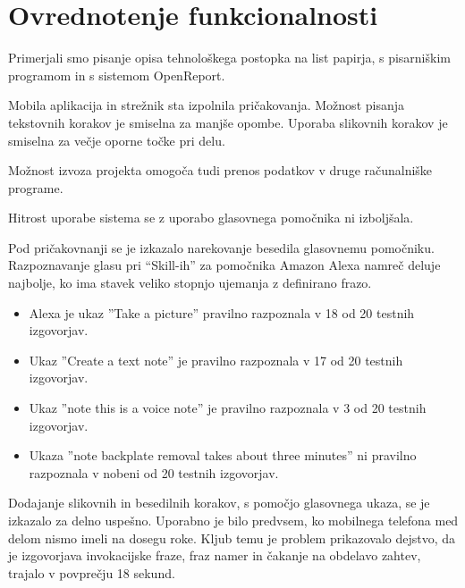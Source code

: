 \documentclass[a4paper, 12pt]{book}
\begin{document}



\section{Ovrednotenje funkcionalnosti}


Primerjali smo pisanje opisa tehnološkega postopka na list papirja, s pisarniškim programom in s sistemom OpenReport.

Mobila aplikacija in strežnik sta izpolnila pričakovanja.
Možnost pisanja tekstovnih korakov je smiselna za manjše opombe.
Uporaba slikovnih korakov je smiselna za večje oporne točke pri delu.

Možnost izvoza projekta omogoča tudi prenos podatkov v druge računalniške programe.

Hitrost uporabe sistema se z uporabo glasovnega pomočnika ni izboljšala.

Pod pričakovnanji se je izkazalo narekovanje besedila glasovnemu pomočniku.
Razpoznavanje glasu pri \enquote{Skill-ih} za pomočnika Amazon Alexa namreč deluje najbolje, ko ima stavek veliko stopnjo ujemanja z definirano frazo.
\begin{itemize}
	\item Alexa je ukaz ''Take a picture'' pravilno razpoznala v 18 od 20 testnih izgovorjav.
	\item Ukaz ''Create a text note'' je pravilno razpoznala v 17 od 20 testnih izgovorjav.
	\item Ukaz ''note this is a voice note'' je pravilno razpoznala v 3 od 20 testnih izgovorjav.
	\item Ukaza ''note backplate removal takes about three minutes'' ni pravilno razpoznala v nobeni od 20 testnih izgovorjav.
\end{itemize}

Dodajanje slikovnih in besedilnih korakov, s pomočjo glasovnega ukaza, se je izkazalo za delno uspešno.
Uporabno je bilo predvsem, ko mobilnega telefona med delom nismo imeli na dosegu roke.
Kljub temu je problem prikazovalo dejstvo, da je izgovorjava invokacijske fraze, fraz namer in čakanje na obdelavo zahtev, trajalo v povprečju 18 sekund.
\end{document}
